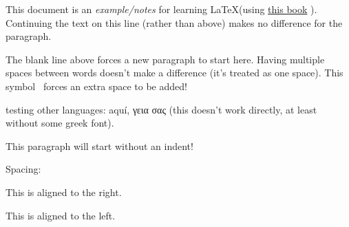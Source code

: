 \documentclass{article}
\begin{document}
This document is an \emph{example/notes} for learning \LaTeX (using \href{https://www.tug.org/twg/mactex/tutorials/ltxprimer-1.0.pdf}{this book} ).
Continuing the text on this line (rather than above) makes no difference for the paragraph.

The blank line above forces a new paragraph to start here.
Having multiple         spaces between words doesn't make a difference (it's treated as one space).
This symbol \ forces an extra space to be added!

testing other languages: aquí, γεια σας (this doesn't work directly, at least without some greek font).


\noindent This paragraph will start without an indent!


\begin{center}
  Spacing:
\end{center}

\begin{flushright}
  This is aligned to the right.
\end{flushright}
\begin{flushleft}
  This is aligned to the left.
\end{flushleft}
\end{document}
